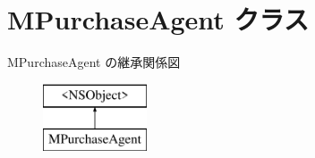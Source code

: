 \hypertarget{interface_m_purchase_agent}{}\section{M\+Purchase\+Agent クラス}
\label{interface_m_purchase_agent}
M\+Purchase\+Agent の継承関係図\begin{figure}[H]
\begin{center}
\leavevmode
\includegraphics[height=2.000000cm]{interface_m_purchase_agent}
\end{center}
\end{figure}
